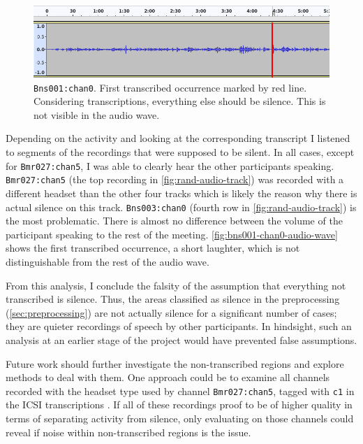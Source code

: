 \documentclass[bsc,frontabs,parskip,deptreport]{infthesis}
\begin{document}
\begin{figure}
    \centering
    \includegraphics[width=12cm]{imgs/audio_waves/Bns003_cha0_first_transcribed_occurence.png}
    \caption{\texttt{Bns001:chan0}. First transcribed occurrence marked by red line. Considering transcriptions, everything else should be silence. This is not visible in the audio wave.}
    \label{fig:bns001-chan0-audio-wave}
\end{figure}
Depending on the activity and looking at the corresponding transcript I listened to segments of the recordings that were supposed to be silent. In all cases, except for \verb|Bmr027:chan5|, I was able to clearly hear the other participants speaking. 
\verb|Bmr027:chan5| (the top recording in \autoref{fig:rand-audio-track}) was recorded with a different headset than the other four tracks which is likely the reason why there is actual silence on this track.
\verb|Bns003:chan0| (fourth row in \autoref{fig:rand-audio-track}) is the most problematic. There is almost no difference between the volume of the participant speaking to the rest of the meeting. \autoref{fig:bns001-chan0-audio-wave} shows the first transcribed occurrence, a short laughter, which is not distinguishable from the rest of the audio wave.

From this analysis, I conclude the falsity of the assumption that everything not transcribed is silence. Thus, the areas classified as silence in the preprocessing (\ref{sec:preprocessing}) are not actually silence for a significant number of cases; they are quieter recordings of speech by other participants. 
In hindsight, such an analysis at an earlier stage of the project would have prevented false assumptions. 

Future work should further investigate the non-transcribed regions and explore methods to deal with them.
One approach could be to examine all channels recorded with the headset type used by channel \verb|Bmr027:chan5|, tagged with \texttt{c1} in the ICSI transcriptions \citep{morgan2001meeting, icsi-naming-conventions}. If all of these recordings proof to be of higher quality in terms of separating activity from silence, only evaluating on those channels could reveal if noise within non-transcribed regions is the issue.
\end{document}
